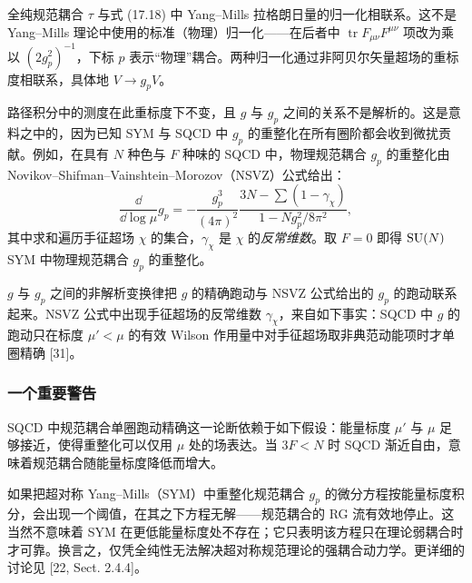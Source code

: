 全纯规范耦合 $\tau$ 与式 (17.18) 中 Yang--Mills 拉格朗日量的归一化相联系。这不是 Yang--Mills 理论中使用的标准（物理）归一化——在后者中 $\operatorname{tr}F_{\mu\nu}F^{\mu\nu}$ 项改为乘以 $(2g_p^2)^{-1}$，下标 $p$ 表示“物理”耦合。两种归一化通过非阿贝尔矢量超场的重标度相联系，具体地 $V\to g_pV$。

路径积分中的测度在此重标度下不变，且 $g$ 与 $g_p$ 之间的关系不是解析的。这是意料之中的，因为已知 SYM 与 SQCD 中 $g_p$ 的重整化在所有圈阶都会收到微扰贡献。例如，在具有 $N$ 种色与 $F$ 种味的 SQCD 中，物理规范耦合 $g_p$ 的重整化由 Novikov--Shifman--Vainshtein--Morozov（NSVZ）公式给出：
\begin{equation}
\frac{\dd}{\dd\log\mu}g_p=-\frac{g_p^3}{(4\pi)^2}\frac{3N-\sum(1-\gamma_\chi)}{1-Ng_p^2/8\pi^2},
\tag{17.38}
\end{equation}
其中求和遍历手征超场 $\chi$ 的集合，$\gamma_\chi$ 是 $\chi$ 的\emph{反常维数}。取 $F=0$ 即得 $\operatorname{SU}(N)$ SYM 中物理规范耦合 $g_p$ 的重整化。


$g$ 与 $g_p$ 之间的非解析变换律把 $g$ 的精确跑动与 NSVZ 公式给出的 $g_p$ 的跑动联系起来。NSVZ 公式中出现手征超场的反常维数 $\gamma_\chi$，来自如下事实：SQCD 中 $g$ 的跑动只在标度 $\mu'<\mu$ 的有效 Wilson 作用量中对手征超场取非典范动能项时才单圈精确 [31]。

\subsubsection*{一个重要警告}

SQCD 中规范耦合单圈跑动精确这一论断依赖于如下假设：能量标度 $\mu'$ 与 $\mu$ 足够接近，使得重整化可以仅用 $\mu$ 处的场表达。当 $3F<N$ 时 SQCD 渐近自由，意味着规范耦合随能量标度降低而增大。


如果把超对称 Yang--Mills（SYM）中重整化规范耦合 $g_p$ 的微分方程按能量标度积分，会出现一个阈值，在其之下方程无解——规范耦合的 RG 流有效地停止。这当然不意味着 SYM 在更低能量标度处不存在；它只表明该方程只在理论弱耦合时才可靠。换言之，仅凭全纯性无法解决超对称规范理论的强耦合动力学。更详细的讨论见 [22, Sect. 2.4.4]。


